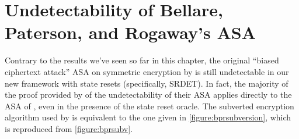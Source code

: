\section{Undetectability of Bellare, Paterson, and Rogaway's ASA} \label{sec:bpranalysis}

Contrary to the results we've seen so far in this chapter, the original ``biased ciphertext attack'' ASA on symmetric encryption by \cite{C:BelPatRog14} is still undetectable in our new framework with state resets (specifically, SRDET). In fact, the majority of the proof provided by \cite{CCS:BelJaeKan15} of the undetectability of their ASA applies directly to the ASA of \cite{C:BelPatRog14}, even in the presence of the state reset oracle. The subverted encryption algorithm used by \cite{C:BelPatRog14} is equivalent to the one given in \autoref{figure:bprsubversion}, which is reproduced from \autoref{figure:bprsubv}.

